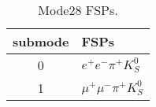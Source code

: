 \begin{table}[h!]
\begin{center}
\begin{tabular}{cl}
\hline
submode& FSPs\\
\hline
0 & $e^+ e^- \pi^+ K_S^0 $ \\
1 & $\mu^+ \mu^- \pi^+ K_S^0 $ \\
\hline
\end{tabular}
\label{tab:Mode28FSPs}
\caption{Mode28 FSPs.}
\end{center}
\end{table}
